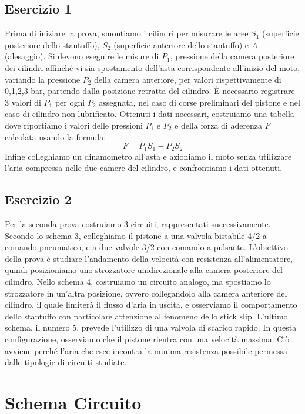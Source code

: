 \documentclass[a4paper]{article}
\begin{document}
\subsection{Esercizio 1}
Prima di iniziare la prova, smontiamo i cilindri per misurare le aree $S_1$ (superficie posteriore dello stantuffo), $S_2$ (superficie anteriore dello stantuffo) e $A$ (alesaggio). Si devono eseguire le misure di $P_1$, pressione della camera posteriore dei cilindri affinché vi sia spostamento dell'asta corrispondente all'inizio del moto, variando la pressione $P_2$ della camera anteriore, per valori rispettivamente di 0,1,2,3 bar, partendo dalla posizione retratta del cilindro. È necessario registrare 3 valori di $P_1$ per ogni $P_2$ assegnata, nel caso di corse preliminari del pistone e nel caso di cilindro non lubrificato. Ottenuti i dati necessari, costruiamo una tabella dove riportiamo i valori delle pressioni $P_1$ e $P_2$ e della forza di aderenza $F$ calcolata usando la formula:
\begin{equation}
F=P_1 S_1-P_2 S_2
\end{equation}
Infine colleghiamo un dinamometro all'asta e azioniamo il moto senza utilizzare l'aria compressa nelle due camere del cilindro, e confrontiamo i dati ottenuti.

\subsection{Esercizio 2}
Per la seconda prova costruiamo 3 circuiti, rappresentati successivamente. Secondo lo schema 3, colleghiamo il pistone a una valvola bistabile 4/2 a comando pneumatico, e a due valvole 3/2 con comando a pulsante. L'obiettivo della prova è studiare l'andamento della velocità con resistenza all'alimentatore, quindi posizioniamo uno strozzatore unidirezionale alla camera posteriore del cilindro. 
Nello schema 4, costruiamo un circuito analogo, ma spostiamo lo strozzatore in un'altra posizione, ovvero collegandolo alla camera anteriore del cilindro, il quale limiterà il flusso d'aria in uscita, e osserviamo il comportamento dello stantuffo con particolare attenzione al fenomeno dello stick slip.
L'ultimo schema, il numero 5, prevede l'utilizzo di una valvola di scarico rapido. In questa configurazione, osserviamo che il pistone rientra con una velocità massima. Ciò avviene perché l'aria che esce incontra la minima resistenza possibile permessa dalle tipologie di circuiti studiate.

\section{Schema Circuito}
\end{document}
